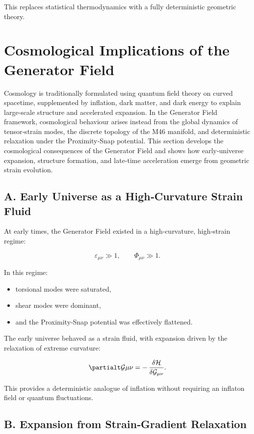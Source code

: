 \documentclass[reprint,amsmath,amssymb,aps,prl,floatfix]{revtex4-2}
\begin{document}
\begin{itemize}
This replaces statistical thermodynamics with a fully deterministic geometric theory.

\section{Cosmological Implications of the Generator Field}

Cosmology is traditionally formulated using quantum field theory on curved spacetime, supplemented by inflation, dark matter, and dark energy to explain large‑scale structure and accelerated expansion. In the Generator Field framework, cosmological behaviour arises instead from the global dynamics of tensor‑strain modes, the discrete topology of the M46 manifold, and deterministic relaxation under the Proximity‑Snap potential. This section develops the cosmological consequences of the Generator Field and shows how early‑universe expansion, structure formation, and late‑time acceleration emerge from geometric strain evolution.

\subsection{A. Early Universe as a High‑Curvature Strain Fluid}

At early times, the Generator Field existed in a high‑curvature, high‑strain regime:

\[
\varepsilon_{\mu\nu} \gg 1,
\qquad
\Phi_{\mu\nu} \gg 1.
\]

In this regime:
\begin{itemize}
\item torsional modes were saturated,  
\item shear modes were dominant,  
\item and the Proximity‑Snap potential was effectively flattened.
\end{itemize}

The early universe behaved as a strain fluid, with expansion driven by the relaxation of extreme curvature:

\[
\partialt \mathcal{G}{\mu\nu}
=
-\,\frac{\delta \mathcal{H}}{\delta \mathcal{G}_{\mu\nu}}.
\]

This provides a deterministic analogue of inflation without requiring an inflaton field or quantum fluctuations.

\subsection{B. Expansion from Strain‑Gradient Relaxation}


\end{itemize}
\end{document}
